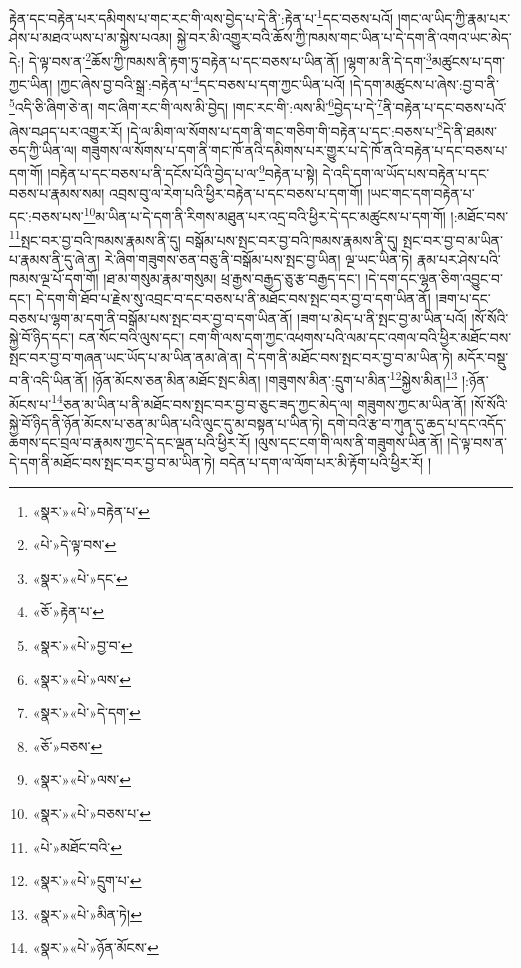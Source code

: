 རྟེན་དང་བརྟེན་པར་དམིགས་པ་གང་རང་གི་ལས་བྱེད་པ་དེ་ནི་:རྟེན་པ་\footnote{«སྣར་»«པེ་»བརྟེན་པ་}དང་བཅས་པའོ། །གང་ལ་ཡིད་ཀྱི་རྣམ་པར་ཤེས་པ་མཐའ་ཡས་པ་མ་སྐྱེས་པའམ། སྐྱེ་བར་མི་འགྱུར་བའི་ཆོས་ཀྱི་ཁམས་གང་ཡིན་པ་དེ་དག་ནི་འགའ་ཡང་མེད་དེ:། དེ་ལྟ་བས་ན་\footnote{«པེ་»དེ་ལྟ་བས་}ཆོས་ཀྱི་ཁམས་ནི་རྟག་ཏུ་བརྟེན་པ་དང་བཅས་པ་ཡིན་ནོ། །ལྷག་མ་ནི་དེ་དག་\footnote{«སྣར་»«པེ་»དང་}མཚུངས་པ་དག་ཀྱང་ཡིན། །ཀྱང་ཞེས་བྱ་བའི་སྒྲ་:བརྟེན་པ་\footnote{«ཅོ་»རྟེན་པ་}དང་བཅས་པ་དག་ཀྱང་ཡིན་པའོ། །དེ་དག་མཚུངས་པ་ཞེས་:བྱ་བ་ནི་\footnote{«སྣར་»«པེ་»བྱ་བ་}འདི་ཅི་ཞིག་ཅེ་ན། གང་ཞིག་རང་གི་ལས་མི་བྱེད། །གང་རང་གི་:ལས་མི་\footnote{«སྣར་»«པེ་»ལས་}བྱེད་པ་དེ་\footnote{«སྣར་»«པེ་»དེ་དག་}ནི་བརྟེན་པ་དང་བཅས་པའོ་ཞེས་བཤད་པར་འགྱུར་རོ། །དེ་ལ་མིག་ལ་སོགས་པ་དག་ནི་གང་གཅིག་གི་བརྟེན་པ་དང་:བཅས་པ་\footnote{«ཅོ་»བཅས་}དེ་ནི་ཐམས་ཅད་ཀྱི་ཡིན་ལ། གཟུགས་ལ་སོགས་པ་དག་ནི་གང་ཁོ་ནའི་དམིགས་པར་གྱུར་པ་དེ་ཁོ་ནའི་བརྟེན་པ་དང་བཅས་པ་དག་གོ། །བརྟེན་པ་དང་བཅས་པ་ནི་དངོས་པོའི་བྱེད་པ་ལ་\footnote{«སྣར་»«པེ་»ལས་}བརྟེན་པ་སྟེ། དེ་འདི་དག་ལ་ཡོད་པས་བརྟེན་པ་དང་བཅས་པ་རྣམས་སམ། འབྲས་བུ་ལ་རེག་པའི་ཕྱིར་བརྟེན་པ་དང་བཅས་པ་དག་གོ། །ཡང་གང་དག་བརྟེན་པ་དང་:བཅས་པས་\footnote{«སྣར་»«པེ་»བཅས་པ་}མ་ཡིན་པ་དེ་དག་ནི་རིགས་མཐུན་པར་འདྲ་བའི་ཕྱིར་དེ་དང་མཚུངས་པ་དག་གོ། །:མཐོང་བས་\footnote{«པེ་»མཐོང་བའི་}སྤང་བར་བྱ་བའི་ཁམས་རྣམས་ནི་དུ། བསྒོམ་པས་སྤང་བར་བྱ་བའི་ཁམས་རྣམས་ནི་དུ། སྤང་བར་བྱ་བ་མ་ཡིན་པ་རྣམས་ནི་དུ་ཞེ་ན། རེ་ཞིག་གཟུགས་ཅན་བཅུ་ནི་བསྒོམ་པས་སྤང་བྱ་ཡིན། ལྔ་ཡང་ཡིན་ཏེ། རྣམ་པར་ཤེས་པའི་ཁམས་ལྔ་པོ་དག་གོ། །ཐ་མ་གསུམ་རྣམ་གསུམ། ཕྲ་རྒྱས་བརྒྱད་ཅུ་རྩ་བརྒྱད་དང་། །དེ་དག་དང་ལྷན་ཅིག་འབྱུང་བ་དང་། དེ་དག་གི་ཐོབ་པ་རྗེས་སུ་འབྲང་བ་དང་བཅས་པ་ནི་མཐོང་བས་སྤང་བར་བྱ་བ་དག་ཡིན་ནོ། །ཟག་པ་དང་བཅས་པ་ལྷག་མ་དག་ནི་བསྒོམ་པས་སྤང་བར་བྱ་བ་དག་ཡིན་ནོ། །ཟག་པ་མེད་པ་ནི་སྤང་བྱ་མ་ཡིན་པའོ། །སོ་སོའི་སྐྱེ་བོ་ཉིད་དང་། ངན་སོང་བའི་ལུས་དང་། ངག་གི་ལས་དག་ཀྱང་འཕགས་པའི་ལམ་དང་འགལ་བའི་ཕྱིར་མཐོང་བས་སྤང་བར་བྱ་བ་གཞན་ཡང་ཡོད་པ་མ་ཡིན་ནམ་ཞེ་ན། དེ་དག་ནི་མཐོང་བས་སྤང་བར་བྱ་བ་མ་ཡིན་ཏེ། མདོར་བསྡུ་བ་ནི་འདི་ཡིན་ནོ། །ཉོན་མོངས་ཅན་མིན་མཐོང་སྤང་མིན། །གཟུགས་མིན་:དྲུག་པ་མིན་\footnote{«སྣར་»«པེ་»དྲུག་པ་}སྐྱེས་མིན།\footnote{«སྣར་»«པེ་»མིན་ཏེ།} །:ཉོན་མོངས་པ་\footnote{«སྣར་»«པེ་»ཉོན་མོངས་}ཅན་མ་ཡིན་པ་ནི་མཐོང་བས་སྤང་བར་བྱ་བ་ཅུང་ཟད་ཀྱང་མེད་ལ། གཟུགས་ཀྱང་མ་ཡིན་ནོ། །སོ་སོའི་སྐྱེ་བོ་ཉིད་ནི་ཉོན་མོངས་པ་ཅན་མ་ཡིན་པའི་ལུང་དུ་མ་བསྟན་པ་ཡིན་ཏེ། དགེ་བའི་རྩ་བ་ཀུན་དུ་ཆད་པ་དང་འདོད་ཆགས་དང་བྲལ་བ་རྣམས་ཀྱང་དེ་དང་ལྡན་པའི་ཕྱིར་རོ། །ལུས་དང་ངག་གི་ལས་ནི་གཟུགས་ཡིན་ནོ། །དེ་ལྟ་བས་ན་དེ་དག་ནི་མཐོང་བས་སྤང་བར་བྱ་བ་མ་ཡིན་ཏེ། བདེན་པ་དག་ལ་ལོག་པར་མི་རྟོག་པའི་ཕྱིར་རོ། །
